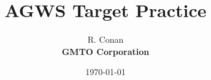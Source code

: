 \documentclass{article}
\begin{document}
\title{\Huge AGWS Target Practice}
\author{R. Conan\\\bf GMTO Corporation}
\date{\today}
\maketitle

\tableofcontents
\clearpage

\end{document}
